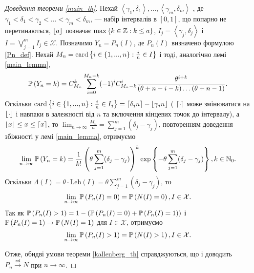\begin{proof}[Доведення теореми \ref{main_th}]\label{main_proof}
    Нехай $\left<\gamma_1, \delta_1 \right>, ..., \left<\gamma_m, \delta_m \right>$ ,
    де $\gamma_1 < \delta_1 < \gamma_2 < ... < \gamma_m < \delta_m$, --- 
    набір інтервалів в $[0, 1]$, що попарно не перетинаються, 
    $\floor*{a}$ позначає $\max\left\{k\in\Z : k \leq a\right\}$,
    $I_j = \left<\gamma_j, \delta_j\right>$ і $I = \bigvee_{j=1}^m I_j \in \mathcal{X}$.
    Позначимо $Y_n = P_n (I)$, де $P_n(I)$ визначено формулою \eqref{Pn_def}.
    Нехай $M_n = \card \left\{ 
        i \in \{1, ..., n\} : \frac{i}{n} \in I
    \right\}$ і тоді, аналогічно лемі \ref{main_lemma},
    \begin{gather*}
        \P{Y_n = k} = C_{M_n}^k \sum_{i=0}^{M_n-k}(-1)^{i} C_{M_n-k}^{i} \frac{\theta^{i+k}}{
            (\theta + n - i - k) \dots (\theta + n - 1)
        }.
    \end{gather*}
    Оскільки 
    $\card \left\{ 
        i \in \{1, ..., n\} : \frac{i}{n} \in I_j
    \right\} = \ceil*{\delta_j n} - \floor*{\gamma_j n}$ (
        $\ceil*{\cdot}$ може змінюватися на $\floor*{\cdot}$ і навпаки
        в залежності від $n$ та включення кінцевих точок до інтервалу), а $\floor*{x} \leq x \leq \ceil*{x}$, то
    $\lim_{n\to\infty}\frac{M_n}{n} = \sum_{j=1}^m (\delta_j - \gamma_j)$,
    повторенням доведення збіжності у лемі \ref{main_lemma},
    отримуємо
    \begin{gather*}
            \lim_{n\to\infty}\P{Y_n = k} = 
            \frac{1}{k!} \left(
                \theta \sum_{j=1}^m (\delta_j - \gamma_j)
            \right)^k
            \exp\left\{ 
                -\theta \sum_{j=1}^m (\delta_j - \gamma_j)
            \right\}, k \in \N_0.
    \end{gather*}
    Оскільки $\Lambda(I) = \theta \cdot \mathrm{Leb}(I) = \theta \sum_{j=1}^m (\delta_j - \gamma_j)$,
    то
    \begin{gather*}
        \lim_{n\to\infty}\P{P_n(I) = 0} = \P{N(I) = 0}, I\in\mathcal{X}.
    \end{gather*}
    Так як $\P{P_n(I) > 1} = 1 - \left(
        \P{P_n(I) = 0} + \P{P_n(I) = 1}
    \right)$ і $\P{P_n(I) = 1} \to \P{N(I) = 1}$ для $I\in\mathcal{X}$,
    отримуємо 
    \begin{gather*}
        \lim_{n\to\infty}\P{P_n(I) > 1} = \P{N(I) > 1}, I\in\mathcal{X}.
    \end{gather*}

    Отже, обидві умови теореми \ref{kallenberg_th} справджуються, що і доводить
    $P_n \overset{vd}{\longrightarrow} N$ при $n\to\infty$.
\end{proof}

